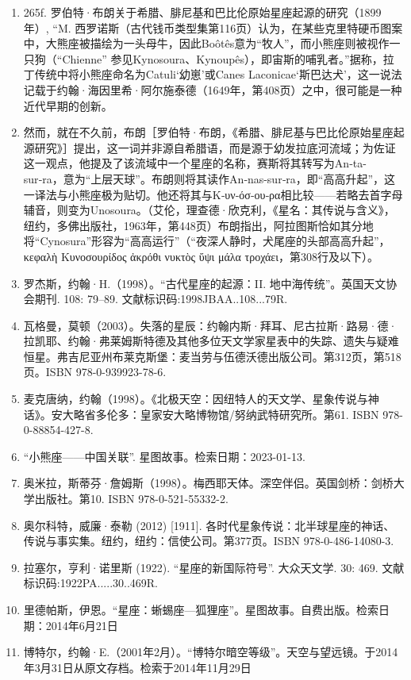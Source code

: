 \begin{enumerate}
\item 265f. 罗伯特·布朗关于希腊、腓尼基和巴比伦原始星座起源的研究（1899年）, “M. 西罗诺斯（古代钱币类型集第116页）认为，在某些克里特硬币图案中，大熊座被描绘为一头母牛，因此Boôtês意为“牧人”，而小熊座则被视作一只狗（“Chienne” 参见Kynosoura、Kynoupês），即宙斯的哺乳者。”据称，拉丁传统中将小熊座命名为Catuli‘幼崽’或Canes Laconicae‘斯巴达犬’，这一说法记载于约翰·海因里希·阿尔施泰德（1649年，第408页）之中，很可能是一种近代早期的创新。
\item 然而，就在不久前，布朗［罗伯特·布朗，《希腊、腓尼基与巴比伦原始星座起源研究》］提出，这一词并非源自希腊语，而是源于幼发拉底河流域；为佐证这一观点，他提及了该流域中一个星座的名称，赛斯将其转写为An‑ta-sur‑ra，意为“上层天球”。布朗则将其读作An‑nas-sur‑ra，即“高高升起”，这一译法与小熊座极为贴切。他还将其与Κ‑υν‑όσ‑ου‑ρα相比较——若略去首字母辅音，则变为Unosoura。（艾伦，理查德·欣克利，《星名：其传说与含义》，纽约，多佛出版社，1963年，第448页）布朗指出，阿拉图斯恰如其分地将“Cynosura”形容为“高高运行”（“夜深人静时，犬尾座的头部高高升起”，κεφαλὴ Κυνοσουρίδος ἀκρόθι νυκτὸς ὕψι μάλα τροχάει，第308行及以下）。
\item 罗杰斯，约翰·H.（1998）。“古代星座的起源：II. 地中海传统”。英国天文协会期刊. 108: 79–89. 文献标识码:1998JBAA..108...79R.
\item 瓦格曼，莫顿（2003）。失落的星辰：约翰内斯·拜耳、尼古拉斯·路易·德·拉凯耶、约翰·弗莱姆斯特德及其他多位天文学家星表中的失踪、遗失与疑难恒星。弗吉尼亚州布莱克斯堡：麦当劳与伍德沃德出版公司。第312页，第518页。ISBN 978-0-939923-78-6.
\item 麦克唐纳，约翰（1998）。《北极天空：因纽特人的天文学、星象传说与神话》。安大略省多伦多：皇家安大略博物馆/努纳武特研究所。第61. ISBN 978-0-88854-427-8.
\item “小熊座——中国关联”. 星图故事。检索日期：2023-01-13.
\item 奥米拉，斯蒂芬·詹姆斯（1998）。梅西耶天体。深空伴侣。英国剑桥：剑桥大学出版社。第10. ISBN 978-0-521-55332-2.
\item 奥尔科特，威廉·泰勒 (2012) [1911]. 各时代星象传说：北半球星座的神话、传说与事实集。纽约，纽约：信使公司。第377页。ISBN 978-0-486-14080-3.
\item 拉塞尔，亨利·诺里斯 (1922). “星座的新国际符号”. 大众天文学. 30: 469. 文献标识码:1922PA.....30..469R.
\item 里德帕斯，伊恩。“星座：蜥蜴座—狐狸座”。星图故事。自费出版。检索日期：2014年6月21日
\item 博特尔，约翰·E.（2001年2月）。“博特尔暗空等级”。天空与望远镜。于2014年3月31日从原文存档。检索于2014年11月29日

\end{enumerate}
